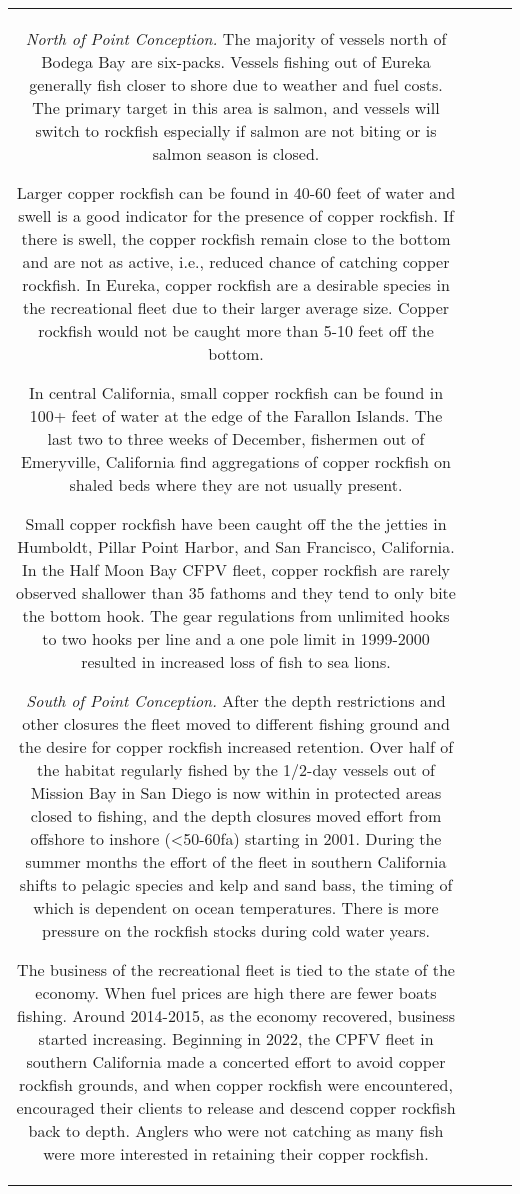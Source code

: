 \documentclass[11pt,
  letterpaper,
]{article}
\begin{document}
\begin{longtable}[t]{c>{\centering\arraybackslash}p{2cm}>{\centering\arraybackslash}p{2cm}>{\centering\arraybackslash}p{2cm}}
\emph{North of Point Conception.} The majority of vessels north of Bodega Bay are six-packs. Vessels fishing out of Eureka generally fish closer to shore due to weather and fuel costs. The primary target in this area is salmon, and vessels will switch to rockfish especially if salmon are not biting or is salmon season is closed.

Larger copper rockfish can be found in 40-60 feet of water and swell is a good indicator for the presence of copper rockfish. If there is swell, the copper rockfish remain close to the bottom and are not as active, i.e., reduced chance of catching copper rockfish. In Eureka, copper rockfish are a desirable species in the recreational fleet due to their larger average size. Copper rockfish would not be caught more than 5-10 feet off the bottom.

In central California, small copper rockfish can be found in 100+ feet of water at the edge of the Farallon Islands. The last two to three weeks of December, fishermen out of Emeryville, California find aggregations of copper rockfish on shaled beds where they are not usually present.

Small copper rockfish have been caught off the the jetties in Humboldt, Pillar Point Harbor, and San Francisco, California. In the Half Moon Bay CFPV fleet, copper rockfish are rarely observed shallower than 35 fathoms and they tend to only bite the bottom hook. The gear regulations from unlimited hooks to two hooks per line and a one pole limit in 1999-2000 resulted in increased loss of fish to sea lions.

\emph{South of Point Conception.} After the depth restrictions and other closures the fleet moved to different fishing ground and the desire for copper rockfish increased retention. Over half of the habitat regularly fished by the 1/2-day vessels out of Mission Bay in San Diego is now within in protected areas closed to fishing, and the depth closures moved effort from offshore to inshore (\textless50-60fa) starting in 2001. During the summer months the effort of the fleet in southern California shifts to pelagic species and kelp and sand bass, the timing of which is dependent on ocean temperatures. There is more pressure on the rockfish stocks during cold water years.

The business of the recreational fleet is tied to the state of the economy. When fuel prices are high there are fewer boats fishing. Around 2014-2015, as the economy recovered, business started increasing. Beginning in 2022, the CPFV fleet in southern California made a concerted effort to avoid copper rockfish grounds, and when copper rockfish were encountered, encouraged their clients to release and descend copper rockfish back to depth. Anglers who were not catching as many fish were more interested in retaining their copper rockfish.


\end{longtable}
\end{document}

